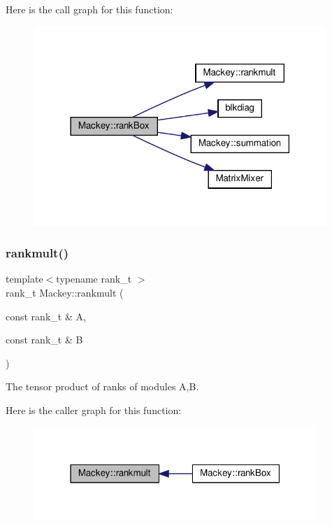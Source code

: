 Here is the call graph for this function\+:\nopagebreak
\begin{figure}[H]
\begin{center}
\leavevmode
\includegraphics[width=314pt]{namespaceMackey_a1257ce64369e72438023fd4e261c7c83_cgraph}
\end{center}
\end{figure}
\mbox{\label{namespaceMackey_aaa0ce7673970bf261628768fb11a1995}} 
\subsubsection{\texorpdfstring{rankmult()}{rankmult()}}
{\footnotesize\ttfamily template$<$typename rank\+\_\+t $>$ \\
rank\+\_\+t Mackey\+::rankmult (\begin{DoxyParamCaption}\item[{const rank\+\_\+t \&}]{A,  }\item[{const rank\+\_\+t \&}]{B }\end{DoxyParamCaption})}



The tensor product of ranks of modules A,B. 

Here is the caller graph for this function\+:\nopagebreak
\begin{figure}[H]
\begin{center}
\leavevmode
\includegraphics[width=304pt]{namespaceMackey_aaa0ce7673970bf261628768fb11a1995_icgraph}
\end{center}
\end{figure}
\mbox{\label{namespaceMackey_a7da73ade3ee83c4ffd614e79242d7c04}} 
